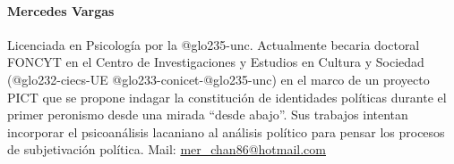 \paragraph{Mercedes Vargas}

Licenciada en Psicología por la \gls{@glo235-unc}. Actualmente becaria doctoral FONCYT en el Centro de Investigaciones y Estudios en Cultura y Sociedad (\gls{@glo232-ciecs}-UE \gls{@glo233-conicet}-\gls{@glo235-unc}) en el marco de un proyecto PICT que se propone indagar la constitución de identidades políticas durante el primer peronismo desde una mirada \enquote{desde abajo}. Sus trabajos intentan incorporar el psicoanálisis lacaniano al análisis político para pensar los procesos de subjetivación política. Mail: \url{mer_chan86@hotmail.com}

\ifPDF
{}
\fi

